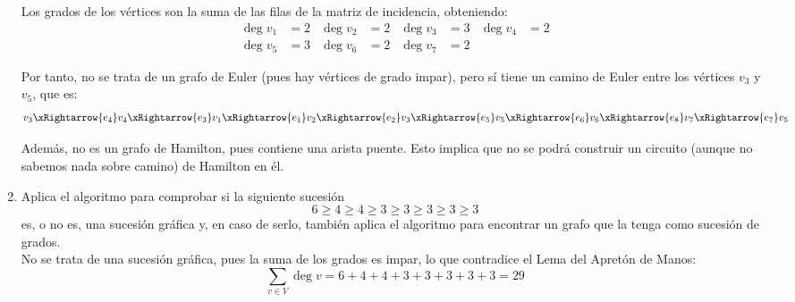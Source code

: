 \begin{ejercicio}
\begin{enumerate}
        Los grados de los vértices son la suma de las filas de la matriz de incidencia, obteniendo:
        \begin{align*}
            \deg v_1 &= 2 & \deg v_2 &= 2 & \deg v_3 &= 3 & \deg v_4 &= 2 \\
            \deg v_5 &= 3 & \deg v_6 &= 2 & \deg v_7 &= 2
        \end{align*}

        Por tanto, no se trata de un grafo de Euler (pues hay vértices de grado impar), pero sí tiene un camino de Euler entre los vértices $v_3$ y $v_5$, que es:
        \begin{equation*}
            v_3\xRightarrow{e_4}v_4\xRightarrow{e_3}v_1\xRightarrow{e_1}v_2\xRightarrow{e_2}v_3\xRightarrow{e_5}v_5\xRightarrow{e_6}v_6\xRightarrow{e_8}v_7\xRightarrow{e_7}v_5
        \end{equation*}

        Además, no es un grafo de Hamilton, pues contiene una arista puente. Esto implica que no se podrá construir un circuito (aunque no sabemos nada sobre camino) de Hamilton en él.
        
        \item Aplica el algoritmo para comprobar si la siguiente sucesión $$6 \geq 4 \geq 4 \geq 3 \geq 3 \geq 3 \geq 3 \geq 3$$ es, o no es, una sucesión gráfica y, en caso de serlo, también aplica el algoritmo para encontrar un grafo que la tenga como sucesión de grados.\\
        
        No se trata de una sucesión gráfica, pues la suma de los grados es impar, lo que contradice el Lema del Apretón de Manos:
        \begin{equation*}
            \sum_{v\in V} \deg v = 6+4+4+3+3+3+3+3 = 29
        \end{equation*}
    \end{enumerate}
\end{ejercicio}


